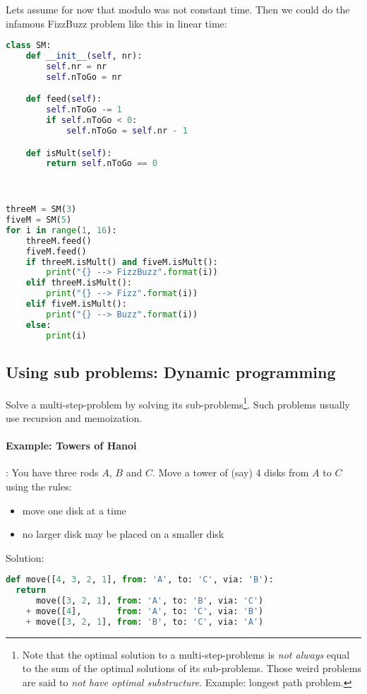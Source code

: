 Lets assume for now that modulo was not constant time. Then we could do the infamous FizzBuzz problem like this in linear time: 

\begin{lstlisting}[language=python]
class SM:
    def __init__(self, nr):
        self.nr = nr
        self.nToGo = nr

    def feed(self):
        self.nToGo -= 1
        if self.nToGo < 0:
            self.nToGo = self.nr - 1

    def isMult(self):
        return self.nToGo == 0



threeM = SM(3)
fiveM = SM(5)
for i in range(1, 16):
    threeM.feed()
    fiveM.feed()
    if threeM.isMult() and fiveM.isMult():
        print("{} --> FizzBuzz".format(i))
    elif threeM.isMult():
        print("{} --> Fizz".format(i))
    elif fiveM.isMult():
        print("{} --> Buzz".format(i))
    else:
        print(i)
\end{lstlisting}

\subsection{Using sub problems: Dynamic programming}
Solve a multi-step-problem by solving its sub-problems\footnote{Note that the optimal solution to a multi-step-problems is \emph{not always} equal to the sum of the optimal solutions of its sub-problems. Those weird problems are said to \emph{not have optimal substructure}. Example: longest path problem.}. 
Such problems usually use recursion and memoization.

\paragraph{Example: Towers of Hanoi}: You have three rods $A$, $B$ and $C$. Move a tower of (say) 4 disks from $A$ to $C$ using the rules:
\begin{itemize}
  \item move one disk at a time
  \item no larger disk may be placed on a smaller disk
\end{itemize}

Solution:
\begin{lstlisting}[language=python]
def move([4, 3, 2, 1], from: 'A', to: 'C', via: 'B'):
  return 
      move([3, 2, 1], from: 'A', to: 'B', via: 'C')
    + move([4],       from: 'A', to: 'C', via: 'B')
    + move([3, 2, 1], from: 'B', to: 'C', via: 'A')
\end{lstlisting}



